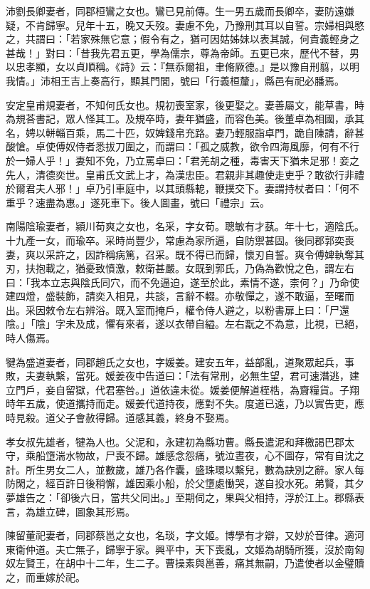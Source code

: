 \begin{pinyinscope}
沛劉長卿妻者，同郡桓鸞之女也。鸞已見前傳。生一男五歲而長卿卒，妻防遠嫌疑，不肯歸寧。兒年十五，晚又夭歿。妻慮不免，乃豫刑其耳以自誓。宗婦相與愍之，共謂曰：「若家殊無它意；假令有之，猶可因姑姊妹以表其誠，何貴義輕身之甚哉！」對曰：「昔我先君五更，學為儒宗，尊為帝師。五更已來，歷代不替，男以忠孝顯，女以貞順稱。《詩》云：『無忝爾祖，聿脩厥德。』是以豫自刑翦，以明我情。」沛相王吉上奏高行，顯其門閭，號曰「行義桓釐」，縣邑有祀必膰焉。

安定皇甫規妻者，不知何氏女也。規初喪室家，後更娶之。妻善屬文，能草書，時為規荅書記，眾人怪其工。及規卒時，妻年猶盛，而容色美。後董卓為相國，承其名，娉以軿輜百乘，馬二十匹，奴婢錢帛充路。妻乃輕服詣卓門，跪自陳請，辭甚酸愴。卓使傅奴侍者悉拔刀圍之，而謂曰：「孤之威教，欲令四海風靡，何有不行於一婦人乎！」妻知不免，乃立罵卓曰：「君羌胡之種，毒害天下猶未足邪！妾之先人，清德奕世。皇甫氏文武上才，為漢忠臣。君親非其趣使走吏乎？敢欲行非禮於爾君夫人邪！」卓乃引車庭中，以其頭縣軶，鞭撲交下。妻謂持杖者曰：「何不重乎？速盡為惠。」遂死車下。後人圖畫，號曰「禮宗」云。

南陽陰瑜妻者，潁川荀爽之女也，名采，字女荀。聰敏有才蓺。年十七，適陰氏。十九產一女，而瑜卒。采時尚豐少，常慮為家所逼，自防禦甚固。後同郡郭奕喪妻，爽以采許之，因詐稱病篤，召采。既不得已而歸，懷刃自誓。爽令傅婢執奪其刃，扶抱載之，猶憂致憤激，敕衛甚嚴。女既到郭氏，乃偽為歡悅之色，謂左右曰：「我本立志與陰氏同穴，而不免逼迫，遂至於此，素情不遂，柰何？」乃命使建四燈，盛裝飾，請奕入相見，共談，言辭不輟。亦敬憚之，遂不敢逼，至曙而出。采因敕令左右辨浴。既入室而掩戶，權令侍人避之，以粉書扉上曰：「尸還陰。」「陰」字未及成，懼有來者，遂以衣帶自縊。左右翫之不為意，比視，已絕，時人傷焉。

犍為盛道妻者，同郡趙氏之女也，字媛姜。建安五年，益部亂，道聚眾起兵，事敗，夫妻執繫，當死。媛姜夜中告道曰：「法有常刑，必無生望，君可速潛逃，建立門戶，妾自留獄，代君塞咎。」道依違未從。媛姜便解道桎梏，為齎糧貨。子翔時年五歲，使道攜持而走。媛姜代道持夜，應對不失。度道已遠，乃以實告吏，應時見殺。道父子會赦得歸。道感其義，終身不娶焉。

孝女叔先雄者，犍為人也。父泥和，永建初為縣功曹。縣長遣泥和拜檄謁巴郡太守，乘船墯湍水物故，尸喪不歸。雄感念怨痛，號泣晝夜，心不圖存，常有自沈之計。所生男女二人，並數歲，雄乃各作囊，盛珠環以繫兒，數為訣別之辭。家人每防閑之，經百許日後稍懈，雄因乘小船，於父墯處慟哭，遂自投水死。弟賢，其夕夢雄告之：「卻後六日，當共父同出。」至期伺之，果與父相持，浮於江上。郡縣表言，為雄立碑，圖象其形焉。

陳留董祀妻者，同郡蔡邕之女也，名琰，字文姬。博學有才辯，又妙於音律。適河東衛仲道。夫亡無子，歸寧于家。興平中，天下喪亂，文姬為胡騎所獲，沒於南匈奴左賢王，在胡中十二年，生二子。曹操素與邕善，痛其無嗣，乃遣使者以金璧贖之，而重嫁於祀。


\end{pinyinscope}
